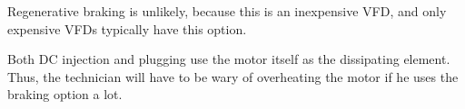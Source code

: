 \vskip 10pt

Regenerative braking is unlikely, because this is an inexpensive VFD, and only expensive VFDs typically have this option.

\vskip 10pt

Both DC injection and plugging use the motor itself as the dissipating element.  Thus, the technician will have to be wary of overheating the motor if he uses the braking option a lot.



